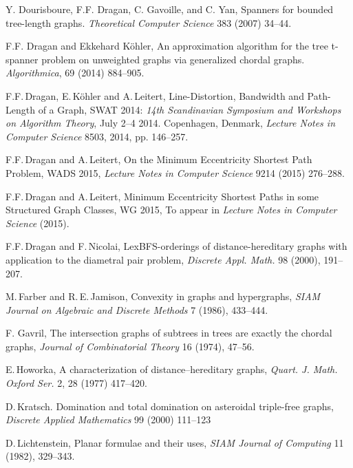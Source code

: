 \documentclass[10pt]{llncs}
\begin{document}
\begin{thebibliography}{99}
    Y. Dourisboure, F.F. Dragan, C. Gavoille, and C. Yan,
    Spanners for bounded tree-length graphs.
    \emph{Theoretical Computer Science} 383 (2007) 34--44.

    F.F. Dragan and Ekkehard Köhler,
    An approximation algorithm for the tree t-spanner problem on unweighted graphs via generalized chordal graphs.
    \emph{Algorithmica}, 69 (2014) 884--905.

    F.F.\,Dragan, E.\,Köhler and A.\,Leitert,
    Line-Distortion, Bandwidth and Path-Length of a Graph,
    SWAT 2014: \emph{14th Scandinavian Symposium and Workshops on Algorithm Theory}, July 2--4 2014. Copenhagen, Denmark, \emph{Lecture Notes in Computer Science} 8503, 2014, pp. 146--257.

    F.F.\,Dragan and A.\,Leitert,
    On the Minimum Eccentricity Shortest Path Problem,
    WADS 2015, \emph{Lecture Notes in Computer Science} 9214 (2015) 276--288.

    F.F.\,Dragan and A.\,Leitert,
    Minimum Eccentricity Shortest Paths in some Structured Graph Classes,
    WG 2015, To appear in \emph{Lecture Notes in Computer Science} (2015).

    F.F.\,Dragan and F.\,Nicolai,
    LexBFS-orderings of distance-hereditary graphs with application to the diametral pair problem, 
    \emph{Discrete Appl. Math.} 98 (2000), 191--207.

    M.\,Farber and R.\,E.\,Jamison,
    Convexity in graphs and hypergraphs,
    \emph{SIAM Journal on Algebraic and Discrete Methods} 7 (1986), 433–444.

     F. Gavril,
     The intersection graphs of subtrees in trees are exactly the chordal graphs,
     \emph{Journal of Combinatorial Theory} 16 (1974), 47--56.

    E.\,Howorka,
    A characterization of distance--hereditary graphs, 
    \emph{Quart. J. Math. Oxford Ser.} 2, 28 (1977) 417--420.

    D.\,Kratsch. 
    Domination and total domination on asteroidal triple-free graphs, 
    \emph{Discrete Applied Mathematics} 99 (2000) 111--123

    D.\,Lichtenstein,
    Planar formulae and their uses,
    \emph{SIAM Journal of Computing} 11 (1982), 329--343.


\end{thebibliography}
\end{document}
